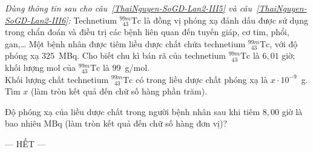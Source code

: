 	\begin{ex}%
		\label{ThaiNguyen-SoGD-Lan2-III5}\textit{Dùng thông tin sau cho câu~\ref{ThaiNguyen-SoGD-Lan2-III5} và câu~\ref{ThaiNguyen-SoGD-Lan2-III6}:} Technetium ${}^{99m}_{\phantom{9}43}\text{Tc}$ là đồng vị phóng xạ đánh dấu được sử dụng trong chẩn đoán và điều trị các bệnh liên quan đến tuyến giáp, cơ tim, phổi, gan,\ldots{} Một bệnh nhân được tiêm liều dược chất chứa technetium ${}^{99m}_{\phantom{9}43}\text{Tc}$, với độ phóng xạ $325$~MBq. Cho biết chu kì bán rã của technetium ${}^{99m}_{\phantom{9}43}\text{Tc}$ là $6{,}01$ giờ; khối lượng mol của ${}^{99m}_{\phantom{9}43}\text{Tc}$ là $99$~g/mol.\\
		Khối lượng chất technetium ${}^{99m}_{\phantom{9}43}\text{Tc}$ có trong liều dược chất phóng xạ là $x\cdot 10^{-9}$~g. Tìm $x$ (làm tròn kết quả đến chữ số hàng phần trăm).
		\par
	\end{ex}

	\begin{ex}%
		\label{ThaiNguyen-SoGD-Lan2-III6}Độ phóng xạ của liều dược chất trong người bệnh nhân sau khi tiêm $8{,}00$ giờ là bao nhiêu MBq (làm tròn kết quả đến chữ số hàng đơn vị)?
		\par
	\end{ex}

	\centerline{--- HẾT ---}


